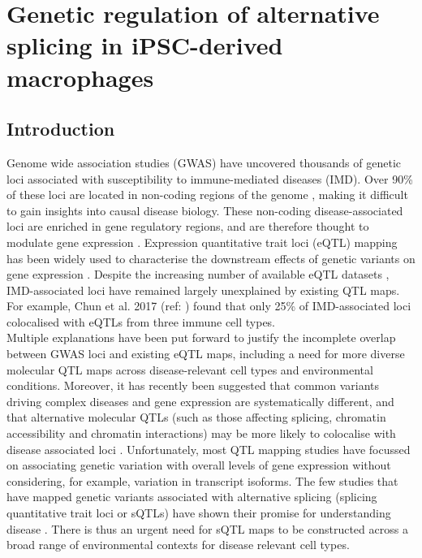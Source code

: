 
\chapter{Genetic regulation of alternative splicing in iPSC-derived macrophages}

\ifpdf
    \graphicspath{{Chapter2/Figs/Raster/}{Chapter2/Figs/PDF/}{Chapter2/Figs/}}
\else
    \graphicspath{{Chapter2/Figs/Vector/}{Chapter2/Figs/}}
\fi
{}
\section{Introduction}
Genome wide association studies (GWAS) have uncovered thousands of genetic loci associated with susceptibility to immune-mediated diseases (IMD). Over 90\% of these loci are located in non-coding regions of the genome \cite{Maurano2012-yw}, making it difficult to gain insights into causal disease biology. These non-coding disease-associated loci are enriched in gene regulatory regions, and are therefore thought to modulate gene expression \cite{Schaub2012-cy}. Expression quantitative trait loci (eQTL) mapping has been widely used to characterise the downstream effects of genetic variants on gene expression \cite{Vosa2021-pb,The_GTEx_Consortium2020-gg}. Despite the increasing number of available eQTL datasets \cite{Kerimov2021-gh}, IMD-associated loci have remained largely unexplained by existing QTL maps. For example, Chun et al. 2017 (ref: \cite{Chun2017-uz}) found that only 25\% of IMD-associated loci colocalised with eQTLs from three immune cell types. \\

Multiple explanations have been put forward to justify the incomplete overlap between GWAS loci and existing eQTL maps, including a need for more diverse molecular QTL maps across disease-relevant cell types and environmental conditions. Moreover, it has recently been suggested that common variants driving complex diseases and gene expression are systematically different, and that alternative molecular QTLs (such as those affecting splicing, chromatin accessibility and chromatin interactions) may be more likely to colocalise with disease associated loci \cite{Mostafavi2022-tg}. Unfortunately, most QTL mapping studies have focussed on associating genetic variation with overall levels of gene expression without considering, for example, variation in transcript isoforms. The few studies that have mapped genetic variants associated with alternative splicing (splicing quantitative trait loci or sQTLs) have shown their promise for understanding disease \cite{Li2016-wu,Kim-Hellmuth2020-gz}. There is thus an urgent need for sQTL maps to be constructed across a broad range of environmental contexts for disease relevant cell types. \\

